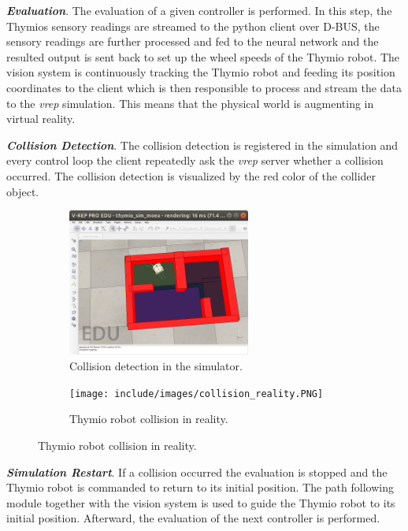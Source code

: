 \textbf{\emph{Evaluation}}. The evaluation of a given controller is performed. In this step, the Thymios sensory readings are streamed to the python client over D-BUS, the sensory readings are further processed and fed to the neural network and the resulted output is sent back to set up the wheel speeds of the Thymio robot. The vision system is continuously tracking the Thymio robot and feeding its position coordinates to the client which is then responsible to process and stream the data to the \emph{vrep} simulation. This means that the physical world is augmenting in virtual reality.

\textbf{\emph{Collision Detection}}. The collision detection is registered in the simulation and every control loop the client repeatedly ask the \emph{vrep} server whether a collision occurred. The collision detection is visualized by the red color of the collider object.

\begin{figure}[H]
    \centering
    \begin{subfigure}[b]{0.4\textwidth}
    	\centering
        \includegraphics[width=6cm]{include/images/collision.PNG}
        \caption{Collision detection in the simulator.}
        \label{fig:thymio_collision_sim}
    \end{subfigure}
    \begin{subfigure}[b]{0.4\textwidth}
    	\centering
        \texttt{[image: include/images/collision\_reality.PNG]}
        \caption{Thymio robot collision in reality.}
        \label{fig:thymio_collision_reality}
    \end{subfigure}
\end{figure}

\textbf{\emph{Simulation Restart}}. If a collision occurred the evaluation is stopped and the Thymio robot is commanded to return to its initial position. The path following module together with the vision system is used to guide the Thymio robot to its initial position. Afterward, the evaluation of the next controller is performed.



